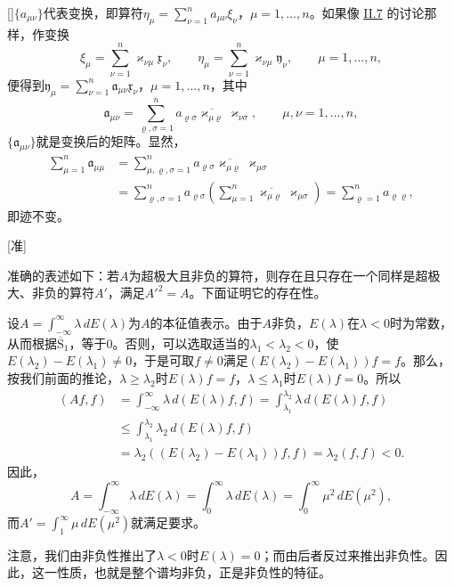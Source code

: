 \documentclass[fontsize=13pt,twoside,openany,headings=normal,parskip=false,bookmarkpackage=false,DIV=calc]{scrbook}
\begin{document}
[]{$\{a_{\mu\nu}\}$代表变换，即算符$\eta_\mu=\sum_{\nu=1}^n a_{\mu\nu}\xi_\nu$，$\mu=1,\allowbreak \ldots,\allowbreak n$。如果像 \hyperref[sec:II.7]{II.7} 的讨论那样，作变换
\[
\xi_\mu=\sum_{\nu=1}^n\varkappa_{\nu\mu}\mathfrak x_\nu,
\qquad
\eta_\mu=\sum_{\nu=1}^n\varkappa_{\nu\mu}\mathfrak y_\nu,
\qquad\mu=1,\ldots,n,
\]\hypertarget{origpage-249}{}\label{origpage-249}便得到$\mathfrak y_\mu=\sum_{\nu=1}^n\mathfrak a_{\mu\nu}\mathfrak x_\nu$，$\mu=1,\allowbreak \ldots,\allowbreak n$，其中
\[
\mathfrak a_{\mu\nu}=\sum_{\varrho,\sigma=1}^n
a_{\varrho\sigma}\overline{\varkappa_{\mu\varrho}}\varkappa_{\nu\sigma},
\qquad\mu,\nu=1,\ldots,n,
\]
$\{\mathfrak a_{\mu\nu}\}$就是变换后的矩阵。显然，
\begin{align*}
\sum_{\mu=1}^n\mathfrak a_{\mu\mu}
&=\sum_{\mu,\varrho,\sigma=1}^n a_{\varrho\sigma}
\overline{\varkappa_{\mu\varrho}}\varkappa_{\mu\sigma}\\
&=\sum_{\varrho,\sigma=1}^n a_{\varrho\sigma}
\left(\sum_{\mu=1}^n\overline{\varkappa_{\mu\varrho}}\varkappa_{\mu\sigma}\right)
=\sum_{\varrho=1}^n a_{\varrho\varrho},
\end{align*}
即迹不变。}

[准]{准确的表述如下：若$A$为超极大且非负的算符，则存在且只存在一个同样是超极大、非负的算符$A'$，满足$A'^2=A$。下面证明它的存在性。

设$A=\int_{-\infty}^{\infty}\lambda\,dE(\lambda)$为$A$的本征值表示。由于$A$非负，$E(\lambda)$在$\lambda<0$时为常数，从而根据$\hyperref[cond:II.Sbar1]{\overline{\mathrm S}_1}$，等于$0$。否则，可以选取适当的$\lambda_1<\lambda_2<0$，使$E(\lambda_2)-E(\lambda_1)\ne0$，于是可取$f\ne0$满足$(E(\lambda_2)-E(\lambda_1))f=f$。那么，按我们前面的推论，$\lambda\ge\lambda_2$时$E(\lambda)f=f$，$\lambda\le\lambda_1$时$E(\lambda)f=0$。所以
\begin{align*}
(Af,f)&=\int_{-\infty}^{\infty}\lambda\,d(E(\lambda)f,f)
=\int_{\lambda_1}^{\lambda_2}\lambda\,d(E(\lambda)f,f)\\
&\le\int_{\lambda_1}^{\lambda_2}\lambda_2\,d(E(\lambda)f,f)\\
&=\lambda_2((E(\lambda_2)-E(\lambda_1))f,f)
=\lambda_2(f,f)<0.
\end{align*}
因此，
\[
A=\int_{-\infty}^{\infty}\lambda\,dE(\lambda)
=\int_0^{\infty}\lambda\,dE(\lambda)
=\int_0^{\infty}\mu^2\,dE(\mu^2),
\]
而$A'=\int_1^{\infty}\mu\,dE(\mu^2)$就满足要求。

注意，我们由非负性推出了$\lambda<0$时$E(\lambda)=0$；而由后者反过来推出非负性。因此，这一性质，也就是整个谱均非负，正是非负性的特征。}
\end{document}

